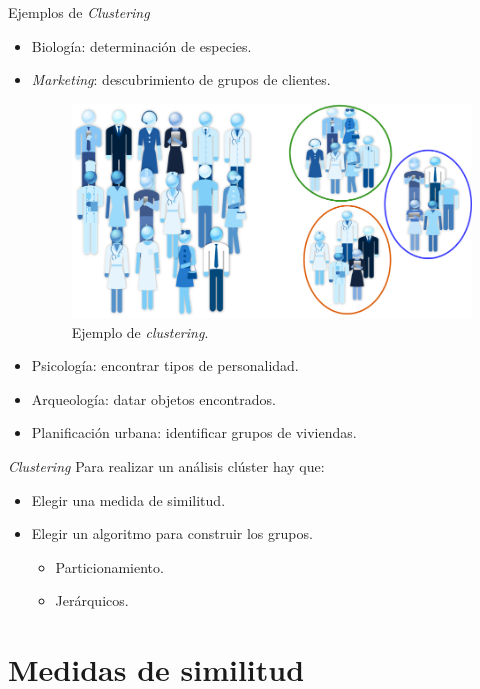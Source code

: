 \documentclass[spanish]{beamer}
\begin{document}
\begin{frame}{Ejemplos de \textit{Clustering}}
  \begin{itemize}
  \item Biología: determinación de especies.
  \item \textit{Marketing}: descubrimiento de grupos de clientes.
    \begin{figure}[H]
	\centering
	\includegraphics[scale=0.5]{ej_marketing}
	\caption{Ejemplo de \textit{clustering}. \cite{noauthor_understanding_nodate}}
\end{figure}
  \item Psicología: encontrar tipos de personalidad.
  \item Arqueología: datar objetos encontrados.
  \item Planificación urbana: identificar grupos de viviendas.
  \end{itemize}
\end{frame}

\begin{frame}{\textit{Clustering}}
  Para realizar un análisis clúster hay que:
  \begin{itemize}
  \item Elegir una medida de similitud.
  \item Elegir un algoritmo para construir los grupos.
    \begin{itemize}
    \item Particionamiento.
    \item Jerárquicos.
    \end{itemize}
  \end{itemize}
\end{frame}

\section{Medidas de similitud}
\end{document}
